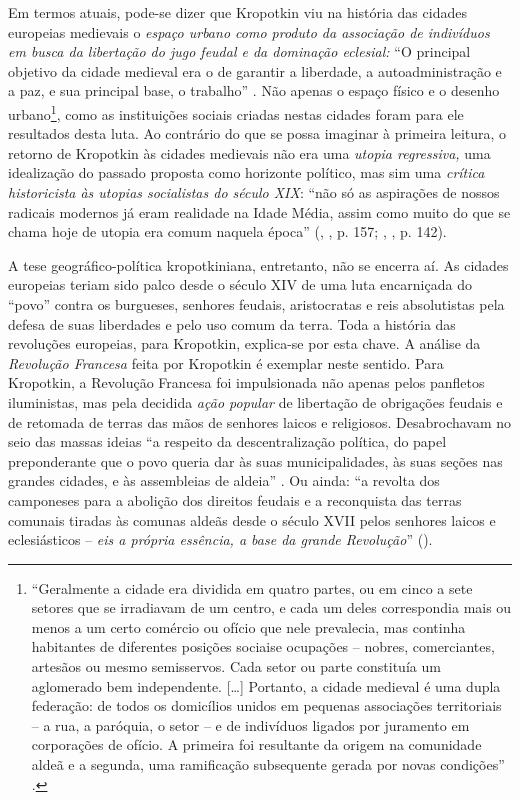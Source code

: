 Em termos atuais, pode-se dizer que Kropotkin viu na história das cidades europeias medievais o \textit{espaço urbano como produto da associação de indivíduos em busca da libertação do jugo feudal e da dominação eclesial:} ``O principal objetivo da cidade medieval era o de garantir a liberdade, a autoadministração e a paz, e sua principal base, o trabalho'' \cite[p.~142]{KROPOTKIN2009}. Não apenas o espaço físico e o desenho urbano\footnote{``Geralmente a cidade era dividida em quatro partes, ou em cinco a sete setores que se irradiavam de um centro, e cada um deles correspondia  mais ou menos a um certo comércio ou ofício que nele prevalecia, mas continha habitantes de diferentes posições sociaise ocupações -- nobres, comerciantes, artesãos ou mesmo semisservos. Cada setor ou parte constituía um aglomerado bem independente. [{\dots}] Portanto, a cidade medieval é uma dupla federação: de todos os domicílios unidos em pequenas associações territoriais -- a rua, a paróquia, o setor -- e de indivíduos ligados por juramento em corporações de ofício. A primeira foi resultante da origem na comunidade aldeã e a segunda, uma ramificação subsequente gerada por novas condições'' \cite[p.~142]{KROPOTKIN2009}.}, como as instituições sociais criadas nestas cidades foram para ele resultados desta luta. Ao contrário do que se possa imaginar à primeira leitura, o retorno de Kropotkin às cidades medievais não era uma \textit{utopia regressiva, }uma idealização do passado proposta como horizonte político, mas sim uma \textit{crítica historicista às utopias socialistas do século XIX}: ``não só as aspirações de nossos radicais modernos já eram realidade na Idade Média, assim como muito do que se chama hoje de utopia era comum naquela época'' (\citeauthor{KROPOTKIN2009}, \citeyear{KROPOTKIN2009}, p. 157; \citeauthor{HORNER1989}, \citeyear{HORNER1989}, p. 142).

A tese geográfico-política kropotkiniana, entretanto, não se encerra aí. As cidades europeias teriam sido palco desde o século XIV de uma luta encarniçada do ``povo'' contra os burgueses, senhores feudais, aristocratas e reis absolutistas pela defesa de suas liberdades e pelo uso comum da terra. Toda a história das revoluções europeias, para Kropotkin, explica-se por esta chave. A análise da  \textit{Revolução Francesa }feita por Kropotkin é exemplar neste sentido. Para Kropotkin, a Revolução Francesa foi impulsionada não apenas pelos panfletos iluministas, mas pela decidida \textit{ação popular }de libertação de obrigações feudais e de retomada de terras das mãos de senhores laicos e religiosos. Desabrochavam no seio das massas ideias ``a respeito da descentralização política, do papel preponderante que o povo queria dar às suas municipalidades, às suas seções nas grandes cidades, e às assembleias de aldeia'' \cite[p.~23]{KROPOTKIN1955}. Ou ainda: ``a revolta dos camponeses para a abolição dos direitos feudais e a reconquista das terras comunais tiradas às comunas aldeãs desde o século XVII pelos senhores laicos e eclesiásticos -- \textit{eis a própria essência, a base da grande Revolução}'' (\cite[p.~114]{KROPOTKIN1955}). 


